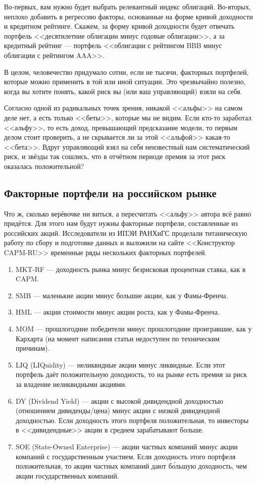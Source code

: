 Во-первых, вам нужно будет выбрать релевантный индекс облигаций. Во-вторых, 
неплохо добавить в регрессию факторы, основанные на форме кривой доходности и 
кредитном рейтинге. Скажем, за форму кривой доходности будет отвечать портфель 
<<десятилетние облигации минус годовые облигации>>, а за кредитный рейтинг --- 
портфель <<облигации с рейтингом BBB минус облигации с рейтингом AAA>>.

В целом, человечество придумало сотни, если не тысячи, факторных портфелей, 
которые можно применить в той или иной ситуации. Это чрезвычайно полезно, когда 
вы хотите понять, какой риск вы (или ваш управляющий) взяли на себя.

Согласно одной из радикальных точек зрения, никакой <<альфы>> на самом деле нет, 
а есть только <<беты>>, которые мы не видим. Если кто-то заработал <<альфу>>, то 
есть доход, превышающий предсказание модели, то первым делом стоит проверить, а 
не скрывается ли за этой <<альфой>> какая-то <<бета>>. Вдруг управляющий взял на 
себя неизвестный нам систематический риск, и звёзды так сошлись, что в отчётном 
периоде премия за этот риск оказалась положительной?

\subsection{Факторные портфели на российском рынке}

Что ж, сколько верёвочке ни виться, а пересчитать <<альфу>> автора всё равно 
придётся. Для этого нам будут нужны факторные портфели, составленные из 
российских акций. Исследователи из ИПЭИ РАНХиГС проделали титаническую работу по 
сбору и подготовке данных и выложили на сайте <<Конструктор CAPM-RU>> 
\cite{capmruWeb}  временные ряды нескольких факторных портфелей.

\begin{enumerate}
\setlength{\itemsep}{0pt}
\item MKT-RF --- доходность рынка минус безрисковая процентная ставка, как в 
CAPM.
\item SMB --- маленькие акции минус большие акции, как у Фамы-Френча.
\item HML --- акции стоимости минус акции роста, как у Фамы-Френча.
\item MOM --- прошлогодние победители минус прошлогодние проигравшие, как у 
Кархарта (на момент написания статьи недоступен по техническим причинам).
\item LIQ (LIQuidity) --- неликвидные акции минус ликвидные. Если этот портфель 
даёт положительную доходность, то на рынке есть премия за риск за владение 
неликвидными акциями.
\item DY (Dividend Yield) --- акции с высокой дивидендной доходностью 
(отношением дивиденды/цена) минус акции с низкой дивидендной доходностью. Если 
доходность этого портфеля положительная, то инвесторы в <<дивидендные>> акции в 
среднем зарабатывают больше.
\item SOE (State-Owned Enterprise) --- акции частных компаний минус акции 
компаний с государственным участием. Если доходность этого портфеля 
положительная, то акции частных компаний дают б\'{о}льшую доходность, чем акции 
государственных компаний.
\end{enumerate}

